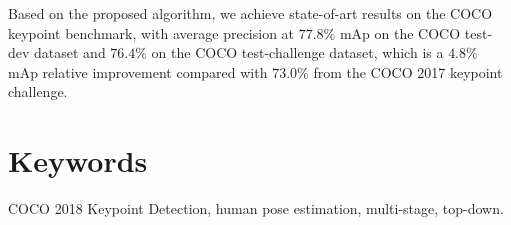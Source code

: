\documentclass[oneside]{memoir}
\begin{document}
Based on the proposed algorithm, we achieve state-of-art results on the COCO keypoint benchmark, with average
precision at $77.8\%$ mAp on the COCO test-dev dataset and $76.4\%$ on the COCO test-challenge dataset, which is a $4.8\%$ mAp
relative improvement compared with $73.0\%$ from the COCO 2017 keypoint challenge.

\section*{Keywords}
COCO 2018 Keypoint Detection, human pose estimation, multi-stage, top-down.


\setcounter{page}{1}
















\appendix

% 
\end{document}
